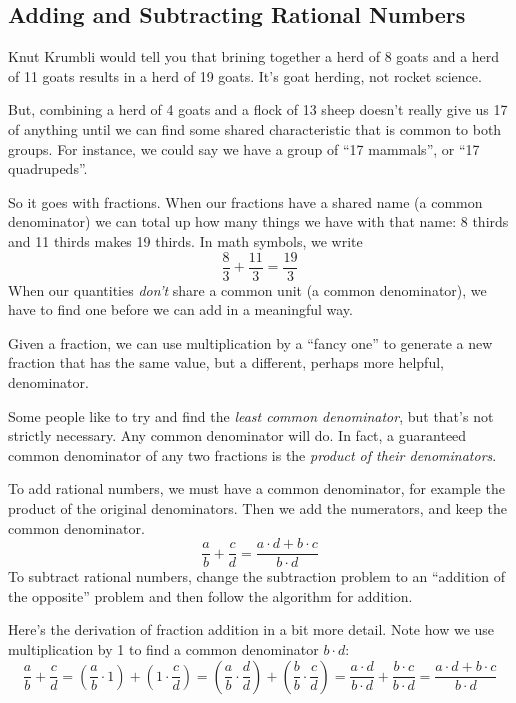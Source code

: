 \subsection{Adding and Subtracting Rational Numbers}

Knut Krumbli would tell you that brining together a herd of 8 goats and a herd of 11 goats results in a herd of 19 goats. It's goat herding, not rocket science.

But, combining a herd of 4 goats and a flock of 13 sheep doesn't really give us 17 of anything until we can find some shared characteristic that is common to both groups. For instance, we could say we have a group of ``17 mammals'', or ``17 quadrupeds''.

So it goes with fractions. When our fractions have a shared name (a common denominator) we can total up how many things we have with that name: 8 thirds and 11 thirds makes 19 thirds. In math symbols, we write \[\frac{8}{3} + \frac{11}{3} = \frac{19}{3}\] When our quantities \textit{don't} share a common unit (a common denominator), we have to find one before we can add in a meaningful way.

Given a fraction, we can use multiplication by a ``fancy one'' to generate a new fraction that has the same value, but a different, perhaps more helpful, denominator.

Some people like to try and find the \textit{least common denominator}, but that's not strictly necessary. Any common denominator will do. In fact, a guaranteed common denominator of any two fractions is the \textit{product of their denominators}.

\begin{boxeddef}
To add rational numbers, we must have a common denominator, for example the product of the original denominators. Then we add the numerators, and keep the common denominator.
\[\frac{a}{b} + \frac{c}{d}
= \frac{a\cdot d + b\cdot c}{b\cdot d}\]
To subtract rational numbers, change the subtraction problem to an ``addition of the opposite'' problem and then follow the algorithm for addition.

Here's the derivation of fraction addition in a bit more detail. Note how we use multiplication by 1 to find a common denominator $b \cdot d$:
\[\frac{a}{b} + \frac{c}{d}
= \left( \frac{a}{b}\cdot 1 \right) + \left( 1\cdot\frac{c}{d} \right)
= \left( \frac{a}{b}\cdot\frac{d}{d} \right) + \left( \frac{b}{b}\cdot\frac{c}{d} \right)
= \frac{a\cdot d}{b\cdot d} + \frac{b\cdot c}{b\cdot d}
= \frac{a\cdot d + b\cdot c}{b\cdot d}\]

\end{boxeddef}

